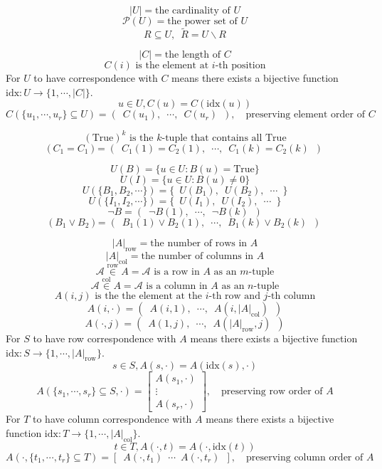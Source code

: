 \documentclass{article}
\begin{document}
	\[ |U| = \text{the cardinality of } U \]
	\[ \mathcal{P}(U) = \text{the power set of } U \]
	\[ R \subseteq U,\enspace \widetilde{R} = U \backslash R \]

	\[ |C| = \text{the length of } C \]
	\[ C(i) \text{ is the element at } i \text{-th position} \]
	For \(U\) to have correspondence with \(C\) means there exists a bijective function \(\mathrm{idx} : U \to \{1, \cdots, |C|\}\).
	\[ u \in U, C(u) = C(\mathrm{idx}(u)) \]
	\[ C(\{u_1, \cdots, u_r\} \subseteq U) = (\enspace C(u_1),\enspace \cdots,\enspace C(u_r)\enspace ), \quad \text{preserving element order of } C \]

	\[ (\mathrm{True})^k \text{ is the } k \text{-tuple that contains all } \mathrm{True} \]
	\[ \bm{(}\ C_1 = C_1 \ \bm{)} = (\enspace C_1(1) = C_2(1),\enspace \cdots,\enspace C_1(k) = C_2(k)\enspace ) \]

	\[ U(B) = \{ u \in U : B(u) = \mathrm{True} \} \]
	\[ U(I) = \{ u \in U : B(u) \neq 0 \} \]
	\[ U(\{B_1, B_2, \cdots\}) = \{\enspace U(B_1),\enspace U(B_2),\enspace \cdots\enspace \} \]
	\[ U(\{I_1, I_2, \cdots\}) = \{\enspace U(I_1),\enspace U(I_2),\enspace \cdots\enspace \} \]
	\[ \neg B = (\enspace \neg B(1),\enspace \cdots,\enspace \neg B(k)\enspace ) \]
	\[ \bm{(}\ B_1 \vee B_2 \ \bm{)} = (\enspace B_1(1) \vee B_2(1),\enspace \cdots,\enspace B_1(k) \vee B_2(k)\enspace ) \]

	\[ |A|_{\mathrm{row}} = \text{the number of rows in } A \]
	\[ |A|_{\mathrm{col}} = \text{the number of columns in } A \]
	\[ \mathcal{A} \overset{\mathrm{row}}{\in} A = \mathcal{A} \text{ is a row in } A  \text{ as an } m \text{-tuple} \]
	\[ \mathcal{A} \overset{\mathrm{col}}{\in} A = \mathcal{A} \text{ is a column in } A  \text{ as an } n \text{-tuple} \]
	\[ A(i, j) \text{ is the the element at the } i \text{-th row and } j \text{-th column} \]
	\[ A(i, \cdot) = (\enspace A(i, 1),\enspace \cdots,\enspace A(i, |A|_{\mathrm{col}})\enspace ) \]
	\[ A(\cdot, j) = (\enspace A(1, j),\enspace \cdots,\enspace A(|A|_{\mathrm{row}}, j)\enspace ) \]
	For \(S\) to have row correspondence with \(A\) means there exists a bijective function \(\mathrm{idx} : S \to \{1, \cdots, |A|_{\mathrm{row}}\}\).
	\[ s \in S, A(s, \cdot) = A(\mathrm{idx}(s), \cdot) \]
	\[
		A(\{s_1, \cdots, s_r\} \subseteq S, \cdot) = \left[
		\begin{array}{c}
			A(s_1, \cdot) \\
			\vdots \\
			A(s_r, \cdot)
		\end{array}
		\right],\quad \text{preserving row order of } A
	\]
	For \(T\) to have column correspondence with \(A\) means there exists a bijective function \(\mathrm{idx} : T \to \{1, \cdots, |A|_{\mathrm{col}}\}\).
	\[ t \in T, A(\cdot, t) = A(\cdot, \mathrm{idx}(t)) \]
	\[ A(\cdot, \{t_1, \cdots, t_r\} \subseteq T) = \left[\enspace A(\cdot, t_1)\enspace \cdots\enspace A(\cdot, t_r)\enspace \right],\quad \text{preserving column order of } A \]
\end{document}
